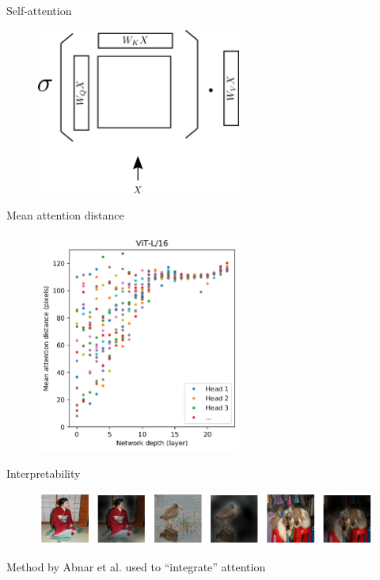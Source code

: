 \documentclass[xcolor=pdftex,dvipsnames,table,mathserif]{beamer}
\begin{document}
\begin{frame}{Self-attention}

  \begin{figure}[ht]
    \centering
    \includegraphics[width=0.6\textwidth]{self_attention}
  \end{figure}


\end{frame}


\begin{frame}{Mean attention distance}

    \begin{figure}[ht]
    \centering
    \includegraphics[width=0.6\textwidth]{mean_attention_distance}
  \end{figure}

\end{frame}


\begin{frame}{Interpretability}

\begin{figure}[ht]
  \centering
  \includegraphics[width=\textwidth]{attention1}
\end{figure}

Method by Abnar et al. used to ``integrate'' attention \cite{abnar_quantifying_2020}

\end{frame}
\end{document}
